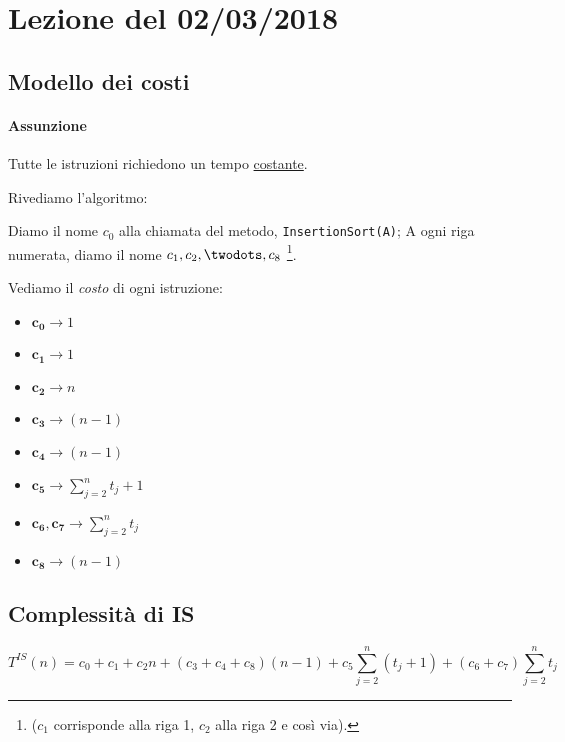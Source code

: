 \section{Lezione del 02/03/2018}

\subsection{Modello dei costi}
\paragraph{Assunzione} Tutte le istruzioni richiedono un tempo \underline{costante}.

Rivediamo l'algoritmo:



Diamo il nome $c_0$ alla chiamata del metodo, \texttt{InsertionSort(A)};
A ogni riga numerata, diamo il nome $c_1, c_2,\twodots ,c_8$
\footnote{($c_1$ corrisponde alla riga 1, $c_2$ alla riga 2 e così via).}.\par
Vediamo il \emph{costo} di ogni istruzione:

\begin{itemize}
    \item[] $\boldsymbol{c_0} \rightarrow 1$
    \item[] $\boldsymbol{c_1} \rightarrow 1$
    \item[] $\boldsymbol{c_2} \rightarrow n$
    \item[] $\boldsymbol{c_3} \rightarrow (n-1)$
    \item[] $\boldsymbol{c_4} \rightarrow (n-1)$
    \item[] $\boldsymbol{c_5} \rightarrow \displaystyle\sum_{j=2}^{n} t_j+1$
    \item[] $\boldsymbol{c_6}, \boldsymbol{c_7} \rightarrow \displaystyle\sum_{j=2}^{n} t_j$
    \item[] $\boldsymbol{c_8} \rightarrow (n-1)$
\end{itemize}

\subsection{Complessità di IS} \label{is:complessita}
\begin{displaymath}
    T^{IS}(n) = c_0 + c_1 + c_2n + (c_3+c_4+c_8)(n-1)
    + c_5\displaystyle\sum_{j=2}^{n}(t_j+1) + (c_6+c_7)\displaystyle\sum_{j=2}^{n}t_j
\end{displaymath}

